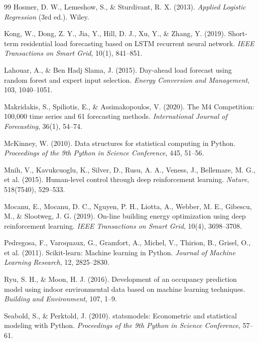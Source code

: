 \documentclass[11pt,a4paper]{article}
\begin{document}
\begin{thebibliography}{99}
 Hosmer, D. W., Lemeshow, S., \& Sturdivant, R. X. (2013). \emph{Applied Logistic Regression} (3rd ed.). Wiley.

 Kong, W., Dong, Z. Y., Jia, Y., Hill, D. J., Xu, Y., \& Zhang, Y. (2019). Short-term residential load forecasting based on LSTM recurrent neural network. \emph{IEEE Transactions on Smart Grid}, 10(1), 841--851.

 Lahouar, A., \& Ben Hadj Slama, J. (2015). Day-ahead load forecast using random forest and expert input selection. \emph{Energy Conversion and Management}, 103, 1040--1051.

 Makridakis, S., Spiliotis, E., \& Assimakopoulos, V. (2020). The M4 Competition: 100,000 time series and 61 forecasting methods. \emph{International Journal of Forecasting}, 36(1), 54--74.

 McKinney, W. (2010). Data structures for statistical computing in Python. \emph{Proceedings of the 9th Python in Science Conference}, 445, 51--56.

 Mnih, V., Kavukcuoglu, K., Silver, D., Rusu, A. A., Veness, J., Bellemare, M. G., et al. (2015). Human-level control through deep reinforcement learning. \emph{Nature}, 518(7540), 529--533.

 Mocanu, E., Mocanu, D. C., Nguyen, P. H., Liotta, A., Webber, M. E., Gibescu, M., \& Slootweg, J. G. (2019). On-line building energy optimization using deep reinforcement learning. \emph{IEEE Transactions on Smart Grid}, 10(4), 3698--3708.

 Pedregosa, F., Varoquaux, G., Gramfort, A., Michel, V., Thirion, B., Grisel, O., et al. (2011). Scikit-learn: Machine learning in Python. \emph{Journal of Machine Learning Research}, 12, 2825--2830.

 Ryu, S. H., \& Moon, H. J. (2016). Development of an occupancy prediction model using indoor environmental data based on machine learning techniques. \emph{Building and Environment}, 107, 1--9.

 Seabold, S., \& Perktold, J. (2010). statsmodels: Econometric and statistical modeling with Python. \emph{Proceedings of the 9th Python in Science Conference}, 57--61.


\end{thebibliography}
\end{document}
